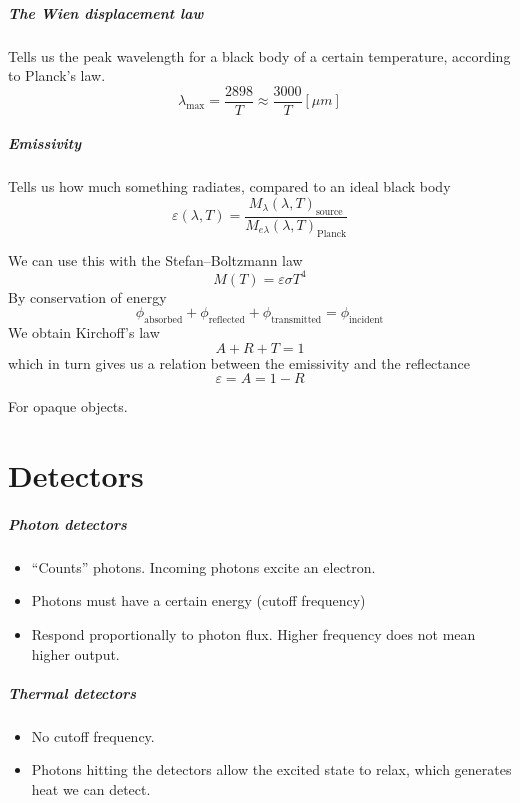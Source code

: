 \documentclass[article]{memoir}
\newcommand{\unit}[1]{\left[#1\right]}
\begin{document}
\paragraph{The Wien displacement law}
Tells us the peak wavelength for a black body of a certain temperature, according to Planck's law.
\[
    \lambda_{\text{max}} = \frac{2898}{T} \approx \frac{3000}{T} \unit{\mu m}
\]
\paragraph{Emissivity}
Tells us how much something radiates, compared to an ideal black body
\[
    \varepsilon(\lambda, T) = \frac{M_\lambda(\lambda, T)_{\text{source}}}{M_{e\lambda}(\lambda, T)_{\text{Planck}}}
\]

We can use this with the Stefan--Boltzmann law
\[
    M(T) = \varepsilon \sigma T^4
\]
By conservation of energy
\[
    \phi_{\text{absorbed}} +\phi_{\text{reflected}} +\phi_{\text{transmitted}} =\phi_{\text{incident}}
\]
We obtain Kirchoff's law
\[
    A + R + T = 1
\]
which in turn gives us a relation between the emissivity and the reflectance
\[
    \varepsilon = A = 1 - R
\]

For opaque objects.


\chapter{Detectors}

\paragraph{Photon detectors}
\begin{itemize}
    \item ``Counts'' photons. Incoming photons excite an electron.
    \item Photons must have a certain energy (cutoff frequency)
    \item Respond proportionally to photon flux. Higher frequency does not mean higher output.

\end{itemize}
\paragraph{Thermal detectors}
\begin{itemize}
    \item No cutoff frequency.
    \item Photons hitting the detectors allow the excited state to relax, which generates heat we can detect.
\end{itemize}
\end{document}
